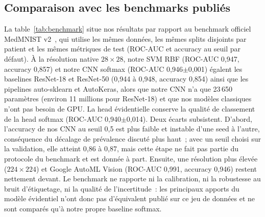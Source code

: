 \documentclass[11pt,a4paper]{article}
\begin{document}
\subsection{Comparaison avec les benchmarks publiés}
La table~\ref{tab:benchmark} situe nos résultats par rapport au benchmark officiel MedMNIST v2~\cite{yang2023medmnist},
qui utilise les mêmes données, les mêmes splits disjoints par patient et les mêmes métriques de test (ROC-AUC et
accuracy au seuil par défaut). À la résolution native $28\times28$, notre SVM RBF (ROC-AUC 0,947, accuracy 0,857) et
notre CNN softmax (ROC-AUC 0,946$\pm$0,001) égalent les baselines ResNet-18 et ResNet-50 (0,944 à 0,948, accuracy 0,854)
ainsi que les pipelines auto-sklearn et AutoKeras, alors que notre CNN n'a que 23\,650 paramètres (environ 11 millions pour ResNet-18) et que nos modèles
classiques n'ont pas besoin de GPU. La head évidentielle conserve la qualité de classement de la head softmax
(ROC-AUC 0,940$\pm$0,014). Deux écarts subsistent. D'abord, l'accuracy de nos CNN au seuil 0,5 est plus faible et
instable d'une seed à l'autre, conséquence du décalage de prévalence discuté plus haut~; avec un seuil choisi sur la
validation, elle atteint 0,86 à 0,87, mais cette étape ne fait pas partie du protocole du benchmark et est donnée à part.
Ensuite, une résolution plus élevée ($224\times224$) et Google AutoML Vision (ROC-AUC 0,991, accuracy 0,946) restent
nettement devant. Le benchmark ne rapporte ni la calibration, ni la robustesse au bruit d'étiquetage, ni la qualité de
l'incertitude~: les principaux apports du modèle évidentiel n'ont donc pas d'équivalent publié sur ce jeu de données et
ne sont comparés qu'à notre propre baseline softmax.


\end{document}
